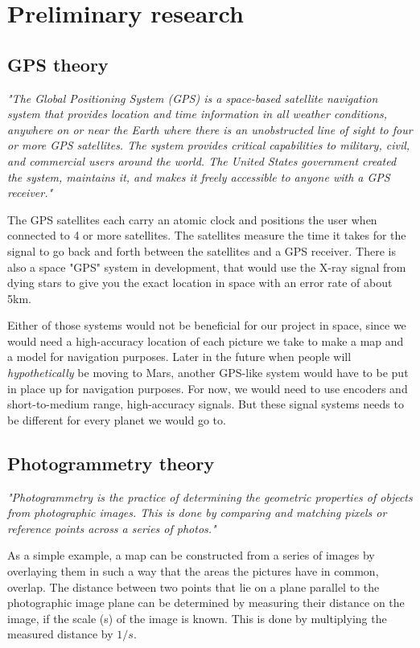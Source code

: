 \clearpage
\section{Preliminary research}

\subsection{GPS theory}

\textit{"The Global Positioning System (GPS) is a space-based satellite navigation system that provides location and time information in all weather conditions, anywhere on or near the Earth where there is an unobstructed line of sight to four or more GPS satellites. The system provides critical capabilities to military, civil, and commercial users around the world. The United States government created the system, maintains it, and makes it freely accessible to anyone with a GPS receiver."\cite{GPS3}}

The GPS satellites each carry an atomic clock and positions the user when connected to 4 or more satellites. The satellites measure the time it takes for the signal to go back and forth between the satellites and a GPS receiver\cite{GPS1}. There is also a space "GPS" system in development, that would use the X-ray signal from dying stars to give you the exact location in space with an error rate of about 5km\cite{GPS2}.

Either of those systems would not be beneficial for our project in space, since we would need a high-accuracy location of each picture we take to make a map and a model for navigation purposes. Later in the future when people will \textit{hypothetically} be moving to Mars, another GPS-like system would have to be put in place up for navigation purposes. For now, we would need to use encoders and short-to-medium range, high-accuracy signals. But these signal systems needs to be different for every planet we would go to. \cite{GPS1} 

\subsection{Photogrammetry theory}

\textit{"Photogrammetry is the practice of determining the geometric properties of objects from photographic images. This is done by comparing and matching pixels or reference points across a series of photos."\cite{Photogrammetry}}

As a simple example, a map can be constructed from a series of images by overlaying them in such a way that the areas the pictures have in common, overlap. The distance between two points that lie on a plane parallel to the photographic image plane can be determined by measuring their distance on the image, if the scale (s) of the image is known. This is done by multiplying the measured distance by $1/s$\cite{photo}\cite{Photogrammetry}.

